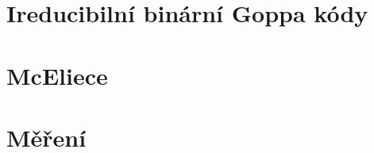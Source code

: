 \documentclass[thesis=M,czech,hidelinks]{FITthesis}[2012/06/26]
\newcommand{\0}{{\textcolor[gray]{0.80}{0}}}
\begin{document}
\section{Ireducibilní binární Goppa kódy}

\section{McEliece}

\section{Měření}




\begin{conclusion}
\end{conclusion}




\end{document}
